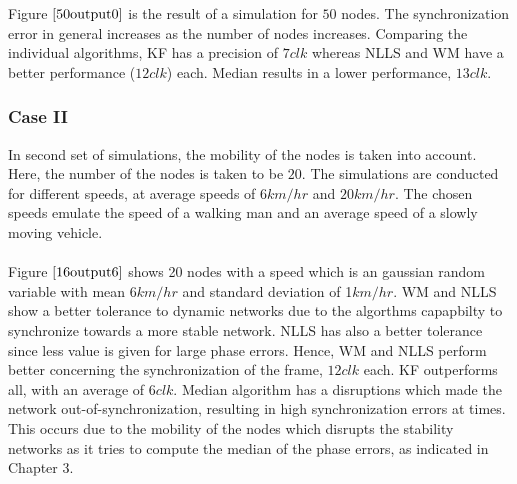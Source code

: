\documentclass[a4paper,10pt]{report}
\begin{document}
Figure $\ref{50output0}$ is the result of a simulation for $50$ nodes. The synchronization error in general increases as the number of nodes increases. Comparing the individual algorithms, KF has a precision of $7clk$ whereas NLLS and WM have a better performance ($12clk$) each. Median results in a lower performance, $13clk$.
\subsubsection{\textbf{Case II}}
In second set of simulations, the mobility of the nodes is taken into account. Here, the number of the nodes is taken to be $20$. The simulations are conducted for different speeds, at average speeds of $6km/hr$ and $20km/hr$. The chosen speeds emulate the speed of a walking man and an average speed of a slowly moving vehicle.
\paragraph*{}
Figure $\ref{16output6}$ shows 20 nodes with a speed which is an gaussian random variable with mean $6km/hr$ and standard
deviation of 1$km/hr$. WM and NLLS show a better tolerance to dynamic networks due to the algorthms capapbilty to synchronize towards a more stable network. NLLS has also a better tolerance since less value is given for large phase errors. Hence, WM and NLLS perform
better concerning the synchronization of the frame, $12 clk$ each. KF outperforms all, with an average of $6 clk$. Median algorithm has a disruptions which made the network out-of-synchronization, resulting in high synchronization errors at times. This occurs due to the mobility of the nodes which disrupts the stability networks as it tries to compute the median of the phase errors, as indicated in Chapter 3.
\end{document}
